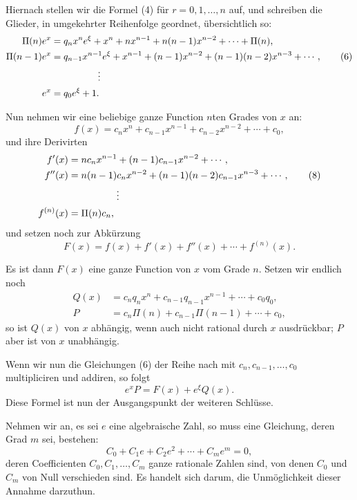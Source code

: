 \documentclass[11pt]{article}
\begin{document}
Hiernach stellen wir die Formel (4) für $r=0,1,\ldots,n$ auf, und schreiben die Glieder, in umgekehrter Reihenfolge geordnet, übersichtlich so:
\begin{align}
\Pi(n)e^x&=q_nx^n e^\xi+x^n+nx^{n-1}+n(n-1)x^{n-2}+\cdots+\Pi(n),\notag\\
\Pi(n-1)e^x&=q_{n-1}x^{n-1}e^\xi+x^{n-1}+(n-1)x^{n-2}
 +(n-1)(n-2)x^{n-3}+\cdots,\tag{6}\\
&\hspace{5em}\vdots\notag\\
e^x&=q_0e^\xi+1.\notag
\end{align}

Nun nehmen wir eine beliebige ganze Function $n$ten Grades von $x$ an:
\begin{equation}\tag{7}
f(x)=c_nx^n+c_{n-1}x^{n-1}+c_{n-2}x^{n-2}+\cdots+c_0,
\end{equation}
und ihre Derivirten
\begin{align}
f'(x)&=nc_nx^{n-1}+(n-1)c_{n-1}x^{n-2}+\cdots,\\
f''(x)&=n(n-1)c_nx^{n-2}+(n-1)(n-2)c_{n-1}x^{n-3}+\cdots,\tag{8}\\
&\hspace{5em}\vdots\notag\\
f^{(n)}(x)&=\Pi(n)c_n,\notag
\end{align}
und setzen noch zur Abkürzung
\begin{equation}\tag{9}
F(x)=f(x)+f'(x)+f''(x)+\cdots+f^{(n)}(x).
\end{equation}

Es ist dann $F(x)$ eine ganze Function von $x$ vom Grade $n$. Setzen wir endlich noch
\begin{align}
Q(x)&=c_nq_nx^n+c_{n-1}q_{n-1}x^{n-1}+\cdots+c_0q_0,\tag{10}\\
P&=c_n\Pi(n)+c_{n-1}\Pi(n-1)+\cdots+c_0,\tag{11}
\end{align}
so ist $Q(x)$ von $x$ abhängig, wenn auch nicht rational durch $x$ ausdrückbar; $P$ aber ist von $x$ unabhängig.

Wenn wir nun die Gleichungen (6) der Reihe nach mit $c_n,c_{n-1},\ldots,c_0$ multipliciren und addiren, so folgt
\begin{equation}\tag{12}
e^xP=F(x)+e^\xi Q(x).
\end{equation}
Diese Formel ist nun der Ausgangspunkt der weiteren Schlüsse.

Nehmen wir an, es sei $e$ eine algebraische Zahl, so muss eine Gleichung, deren Grad $m$ sei, bestehen:
\begin{equation}\tag{13}
C_0+C_1e+C_2e^2+\cdots+C_me^m=0,
\end{equation}
deren Coefficienten $C_0,C_1,\ldots,C_m$ ganze rationale Zahlen sind, von denen $C_0$ und $C_m$ von Null verschieden sind. Es handelt sich darum, die Unmöglichkeit dieser Annahme darzuthun.
\end{document}

